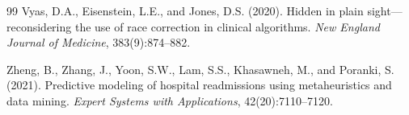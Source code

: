 \documentclass[11pt,letterpaper]{article}
\begin{document}
\begin{thebibliography}{99}
Vyas, D.A., Eisenstein, L.E., and Jones, D.S. (2020).
\newblock Hidden in plain sight---reconsidering the use of race correction in clinical algorithms.
\newblock \textit{New England Journal of Medicine}, 383(9):874--882.

Zheng, B., Zhang, J., Yoon, S.W., Lam, S.S., Khasawneh, M., and Poranki, S. (2021).
\newblock Predictive modeling of hospital readmissions using metaheuristics and data mining.
\newblock \textit{Expert Systems with Applications}, 42(20):7110--7120.

\end{thebibliography}
\end{document}
